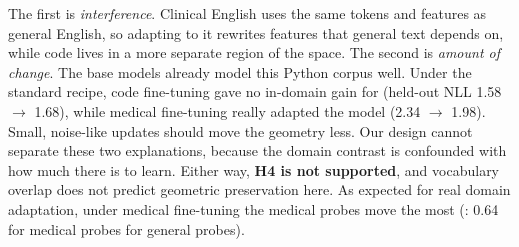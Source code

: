  The first is \emph{interference}. Clinical English uses the same tokens and features as general English, so adapting to it rewrites features that general text depends on, while code lives in a more separate region of the space. The second is \emph{amount of change}. The base models already model this Python corpus well. Under the standard recipe, code fine-tuning gave no in-domain gain for \qwenS (held-out NLL 1.58 $\rightarrow$ 1.68), while medical fine-tuning really adapted the model (2.34 $\rightarrow$ 1.98). Small, noise-like updates should move the geometry less. Our design cannot separate these two explanations, because the domain contrast is confounded with how much there is to learn. Either way, {\bf H4 is not supported}, and vocabulary overlap does not predict geometric preservation here. As expected for real domain adaptation, under medical fine-tuning the medical probes move the most (\qwenS: 0.64 for medical probes  for general probes).
